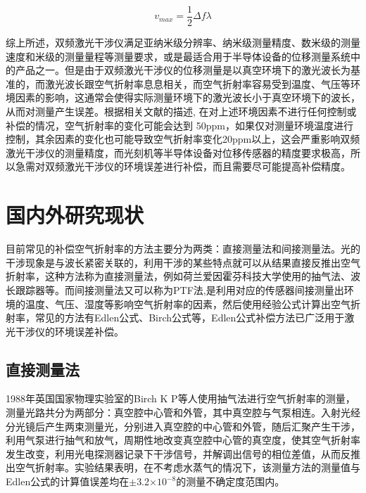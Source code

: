\begin{equation}\label{eq:干涉仪最大测量速度}
  v_{max}=\frac{1}{2}\Delta f\lambda
\end{equation}

综上所述，双频激光干涉仪满足亚纳米级分辨率、纳米级测量精度、数米级的测量速度和米级的测量量程等测量要求，或是最适合用于半导体设备的位移测量系统中的产品之一。但是由于双频激光干涉仪的位移测量是以真空环境下的激光波长为基准的，而激光波长跟空气折射率息息相关，而空气折射率容易受到温度、气压等环境因素的影响，这通常会使得实际测量环境下的激光波长小于真空环境下的波长\cite{戴成睿硕士论文面向激光追踪测量系统的空气折射率补偿方法研究}，从而对测量产生误差。根据相关文献的描述, 在对上述环境因素不进行任何控制或补偿的情况，空气折射率的变化可能会达到 50ppm，如果仅对测量环境温度进行控制，其余因素的变化也可能导致空气折射率变化20ppm以上\cite{徐建2013双频激光干涉仪系统线性测量误差主要来源及减小误差的方法分析}，这会严重影响双频激光干涉仪的测量精度，而光刻机等半导体设备对位移传感器的精度要求极高，所以急需对双频激光干涉仪的环境误差进行补偿，而且需要尽可能提高补偿精度。



\section{国内外研究现状}
目前常见的补偿空气折射率的方法主要分为两类：直接测量法和间接测量法。光的干涉现象是与波长紧密关联的，利用干涉的某些特点就可以从结果直接反推出空气折射率，这种方法称为直接测量法，例如荷兰爱因霍芬科技大学使用的抽气法、波长跟踪器等。而间接测量法又可以称为PTF法\cite{高精度空气折射率测量系统设计与实现},是利用对应的传感器间接测量出环境的温度、气压、湿度等影响空气折射率的因素，然后使用经验公式计算出空气折射率，常见的方法有Edlen公式、Birch公式等，Edlen公式补偿方法已广泛用于激光干涉仪的环境误差补偿。

\subsection{直接测量法}
1988年英国国家物理实验室的Birch K P等人使用抽气法进行空气折射率的测量，测量光路共分为两部分：真空腔中心管和外管，其中真空腔与气泵相连。入射光经分光镜后产生两束测量光，分别进入真空腔的中心管和外管，随后汇聚产生干涉，利用气泵进行抽气和放气，周期性地改变真空腔中心管的真空度，使其空气折射率发生改变，利用光电探测器记录下干涉信号，并解调出信号的相位差值，从而反推出空气折射率。实验结果表明，在不考虑水蒸气的情况下，该测量方法的测量值与Edlen公式的计算值误差均在$\pm$3.2$\times 10^{-8}$的测量不确定度范围内\cite{1988The}。

